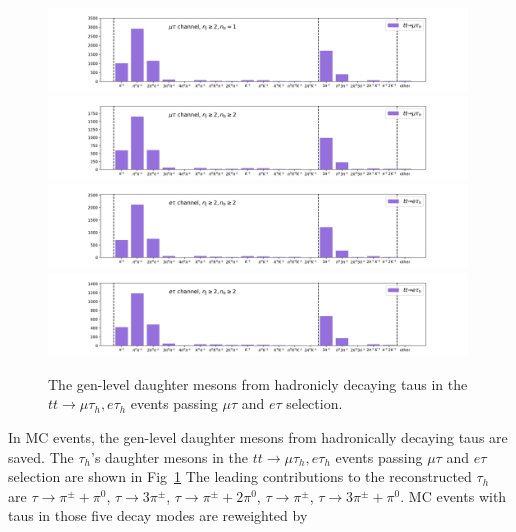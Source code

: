 \begin{figure}
    \centering
    \includegraphics[width=0.99\textwidth]{chapters/Analysis/sectionCalibration/figures/tauBr/tauhDecay_mutau.png}
    \includegraphics[width=0.99\textwidth]{chapters/Analysis/sectionCalibration/figures/tauBr/tauhDecay_mutau2.png}
    \includegraphics[width=0.99\textwidth]{chapters/Analysis/sectionCalibration/figures/tauBr/tauhDecay_etau.png}
    \includegraphics[width=0.99\textwidth]{chapters/Analysis/sectionCalibration/figures/tauBr/tauhDecay_etau2.png}
    \caption{The gen-level daughter mesons from hadronicly decaying taus in the $tt\to \mu \tau_h, e \tau_h$ events passing $\mu \tau$ and $e \tau$ selection.}
    \label{fig:appendix:reweightTauhBr:tauhBr}
\end{figure}


In MC events, the gen-level daughter mesons from hadronically decaying taus are saved.  The $\tau_h$'s daughter mesons in the $tt\to \mu \tau_h, e \tau_h$ events  passing $\mu \tau$ and $e \tau$ selection are shown in Fig~\ref{fig:appendix:reweightTauhBr:tauhBr} The leading contributions to the reconstructed $\tau_h$ are $\tau\to \pi^\pm+\pi^0 $, $\tau\to 3\pi^\pm$, $\tau\to \pi^\pm+2\pi^0$, $\tau\to \pi^\pm$, $\tau\to 3\pi^\pm + \pi^0$.  MC events with taus in those five decay modes are reweighted by 

